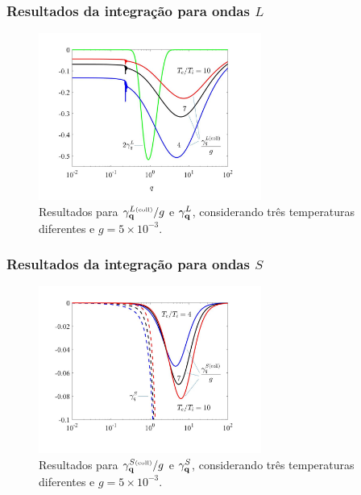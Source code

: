 \documentclass[10pt,aspectratio=1610,lualatex]{beamer}
\begin{document}
\begin{frame}
  \frametitle{Resultados da integração para ondas $L$}
  \begin{figure}
    \centering
    \includegraphics[width=0.65\textwidth]{F1}
    \caption*{Resultados para  $\gamma_{\bf q}^{L \mbox{\tiny(coll)}}/g$
      e $\gamma_{\bf q}^L$, considerando três temperaturas diferentes e
      $g=5\times 10^{-3}$.}
  \end{figure}
\end{frame}

\begin{frame}
  \frametitle{Resultados da integração para ondas $S$}
  \begin{figure}
    \centering
    \includegraphics[width=0.65\textwidth]{F2}
    \caption*{Resultados para  $\gamma_{\bf q}^{S \mbox{\tiny(coll)}}/g$
      e $\gamma_{\bf q}^S$, considerando três temperaturas diferentes e
    $g=5\times 10^{-3}$.}
  \end{figure}
\end{frame}
\end{document}
